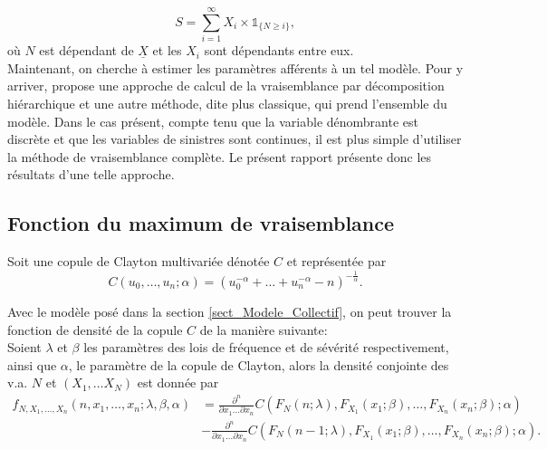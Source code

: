 \documentclass{article}
\begin{document}
		\begin{equation}\label{Modele_collectif}
			S = \sum_{i=1}^{\infty} X_i \times \mathds{1}_{\{N \geq i\}},
		\end{equation}
		où $N$ est dépendant de $\underline{X}$ et les $X_i$ sont dépendants entre eux. \\
		
		Maintenant, on cherche à estimer les paramètres afférents à un tel modèle. Pour y arriver, \cite{LikelyhoodEstimation} propose une approche de calcul de la vraisemblance par décomposition hiérarchique et une autre méthode, dite plus classique, qui prend l'ensemble du modèle. Dans le cas présent, compte tenu que la variable dénombrante est discrète et que les variables de sinistres sont continues, il est plus simple d'utiliser la méthode de vraisemblance complète. Le présent rapport présente donc les résultats d'une telle approche.
				
	
	\subsection{Fonction du maximum de vraisemblance} \label{sect_Maxlikelyhood}
	
		Soit une copule de Clayton multivariée dénotée $C$ et représentée par
		\begin{equation}\label{Copule_Clayton}
		C(u_0,\dots,u_n;\alpha) = (  u_0^{-\alpha} + \dots + u_n^{-\alpha} - n)^{-\frac{1}{\alpha}}.
		\end{equation}
	
		Avec le modèle posé dans la section \ref{sect_Modele_Collectif}, on peut trouver la fonction de densité de la copule $C$ de la manière suivante:\\
	
		Soient $\lambda$ et $\beta$ les paramètres des lois de fréquence et de sévérité respectivement, ainsi que $\alpha$, le paramètre de la copule de Clayton, alors la densité conjointe des v.a. $N$ et $(X_1, \dots X_N)$ est donnée par
		\begin{align}
		f_{N, X_1, \dots, X_n}(n, x_1, \dots, x_n; \lambda, \beta, \alpha) 
		&= \frac{\partial^n}{\partial x_1 \dots \partial x_n} C(F_N(n;\lambda),F_{X_1}(x_1; \beta),\dots,F_{X_n}(x_n;\beta);\alpha)  \nonumber \\
		&   - \frac{\partial^n}{\partial x_1 \dots \partial x_n} C(F_N(n-1;\lambda),F_{X_1}(x_1;\beta),\dots,F_{X_n}(x_n;\beta);\alpha). \label{densite_composee}
		\end{align}
		
\end{document}
